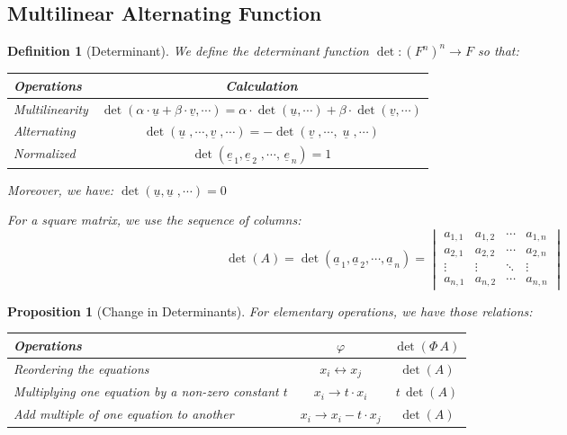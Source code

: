 \documentclass[12pt]{article}
\newcommand{\tuple}[1]{\underline{#1}}
\newtheorem{definition}{Definition}[subsection]
\newtheorem{proposition}{Proposition}[subsection]
\begin{document}
\subsection{Multilinear Alternating Function}

\begin{definition}[Determinant]
  We define the determinant function $\det:(F^n)^n\to F$ so that:
  \begin{table}[H]
    \centering
    \begin{tabular}{|p{2.5cm}|c|}\hline
      Operations & Calculation\\\hline
      Multilinearity &$\det(\alpha\cdot\tuple{u}+\beta\cdot \tuple{v},\cdots)=\alpha\cdot\det(\tuple{u},\cdots)+\beta\cdot\det(\tuple{v},\cdots)$\\\hline
      Alternating & $\det(\tuple{u}\;,\cdots,\tuple{v}\;,\cdots)=-\det(\tuple{v}\;,\cdots,\;\tuple{u}\;,\cdots)$ \\\hline
      Normalized & $\det(\tuple{e}_{\,1},\tuple{e}_{\,2}\;,\cdots,\,\tuple{e}_{\,n})=1$ \\\hline
    \end{tabular}
  \end{table}
  
  Moreover, we have: $\det(\tuple{u},\tuple{u}\;,\cdots)=0$

  For a square matrix, we use the sequence of columns: $$\det(A)=\det(\tuple{a}_{\,1},\tuple{a}_{\,2},\cdots,\tuple{a}_{\,n})=\begin{vmatrix}a_{1,1}&a_{1,2}&\cdots&a_{1,n}\\a_{2,1}&a_{2,2}&\cdots&a_{2,n}\\\vdots&\vdots&\ddots&\vdots\\a_{n,1}&a_{n,2}&\cdots&a_{n,n}\end{vmatrix}$$
\end{definition}

\begin{proposition}[Change in Determinants]
  For elementary operations, we have those relations:
  \begin{table}[H]
    \centering
    \begin{tabular}{|p{5cm}|c|c|}\hline
      Operations & $\varphi$ & $\det(\Phi\,A)$\\\hline
      Reordering the equations & $x_i\leftrightarrow x_j$ & $\det(A)$ \\\hline
      Multiplying one equation by a non-zero constant $t$ & $x_i\rightarrow t\cdot x_i$ & $t\,\det(A)$\\\hline
      Add multiple of one equation to another & $x_i\rightarrow x_i-t\cdot x_j$ & $\det(A)$ \\\hline
    \end{tabular}
  \end{table}
\end{proposition}
\end{document}
